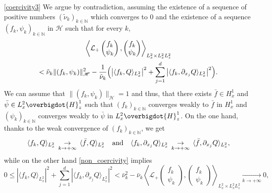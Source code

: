 \begin{ProofOf}{\eqref{coercivity3}}
We argue by contradiction, assuming the existence of a sequence of positive numbers $(\tilde{\nu}_{k})_{k\in\mathbb N}$ which converges to $0$ and the existence of a sequence $(f_{k},\psi_{k})_{k\in\mathbb N}$ in $\mathscr{H}$ such that for every $k$,
\begin{multline}\label{non_coercivity}
\left\langle\mathcal{L}_{+}\begin{pmatrix} f_{k}\\\psi_{k} \end{pmatrix},\begin{pmatrix} f_{k}\\\psi_{k} \end{pmatrix}\right\rangle_{L_{x}^{2}\times L_{x}^{2}L_{z}^{2}}
\\
<\tilde{\nu}_{k}\|(f_{k},\psi_{k})\|_{\mathscr{H}}^{2}-\frac{1}{\tilde{\nu}_{k}}\Bigl(\left|\langle f_{k},Q\rangle_{L_{x}^{2}}\right|^{2}+\sum\limits_{j=1}^{d}\left|\langle f_{k},\partial_{x_{j}}Q\rangle_{L_{x}^{2}}\right|^{2}\Bigr).
\end{multline}
We can assume that $\| (f_{k},\psi_{k})\|_{\mathscr{H}}=1$ and thus, that there exists $\bar{f}\in H_{x}^{1}$ and $\bar{\psi}\in L_{x}^{2}\overbigdot{H}_{z}^{1}$ such that $(f_{k})_{k\in\mathbb N}$ converges weakly to $\bar{f}$ in $H_{x}^{1}$ and $(\psi_{k})_{k\in\mathbb N}$ converges weakly to $\bar{\psi}$ in $L_{x}^{2}\overbigdot{H}_{z}^{1}$. On the one hand, thanks to the weak convergence of $(f_{k})_{k\in\mathbb N}$, we get
\[
\langle f_{k},Q\rangle_{L_{x}^{2}}\,\underset{k\to+\infty}{\to}\,\langle\bar{f},Q\rangle_{L_{x}^{2}} \hspace{0.25cm}\text{ and }\hspace{0.25cm} \langle f_{k},\partial_{x_{j}}Q\rangle_{L_{x}^{2}}\,\underset{k\to+\infty}{\to}\,\langle\bar{f},\partial_{x_{j}}Q\rangle_{L_{x}^{2}},
\]
while on the other hand \eqref{non_coercivity} implies
\[
0\leq\left|\langle f_{k},Q\rangle_{L_{x}^{2}}\right|^{2}+\sum\limits_{j=1}^{d}\left|\langle f_{k},\partial_{x_{j}}Q\rangle_{L_{x}^{2}}\right|^{2}<\bar{\nu}_{k}^{2}-\bar{\nu}_{k}\left\langle\mathcal{L}_{+}\begin{pmatrix} f_{k}\\\psi_{k} \end{pmatrix},\begin{pmatrix} f_{k}\\\psi_{k} \end{pmatrix}\right\rangle_{L_{x}^{2}\times L_{x}^{2}L_{z}^{2}}\underset{k\to+\infty}{\to}0,
\]
\end{ProofOf}

